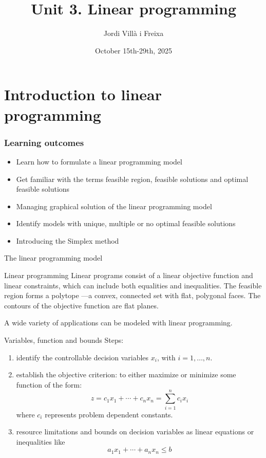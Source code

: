 \documentclass[c]{beamer}
\title[Introduction]{Unit 3. Linear programming}
\author{Jordi Villà i Freixa}
\institute[FCTE]{
Universitat de Vic - Universitat Central de Catalunya \\
Study Abroad. Operations Research\\
\medskip
\textit{jordi.villa@uvic.cat\\\url{https://mon.uvic.cat/cbbl}}
}
\date{October 15th-29th, 2025}
\begin{document}
\begin{frame}
\titlepage
\end{frame}




\section{Introduction to linear programming}

\begin{frame}
\frametitle{Learning outcomes}
\begin{itemize}
  \item Learn how to formulate a linear programming model
  \item Get familiar with the terms feasible region, feasible solutions and optimal feasible solutions
  \item Managing graphical solution of the linear programming model
  \item Identify models with unique, multiple or no optimal feasible solutions
  \item Introducing the Simplex method
\end{itemize}
\end{frame}


\begin{frame}{The linear programming model}

  \begin{block}{Linear programming}
    Linear programs consist of a linear objective function and linear constraints, which can include both equalities and inequalities. The feasible region forms a polytope —a convex, connected set with flat, polygonal faces. The contours of the objective function are flat planes.
   \cite{nocedal}
  \end{block}
  A wide variety of applications can be modeled with linear programming.

\end{frame}

\begin{frame}{Variables, function and bounds}
  Steps:
\begin{enumerate}
  \item identify the controllable decision variables $x_i$, with $i=1,\ldots,n$.
  \item establish the objective criterion: to either maximize or minimize some function of the form:
  \[
    z = c_1 x_1 +\cdots + c_n x_n = \sum_{i=1}^n c_i x_i
  \]
  where $c_i$ represents problem dependent constants.
  \item resource limitations and bounds on decision variables as linear equations or inequalities like
  \[
     a_1 x_1 +\cdots + a_n x_n \leq b
  \]
\end{enumerate}
\end{frame}
\end{document}
